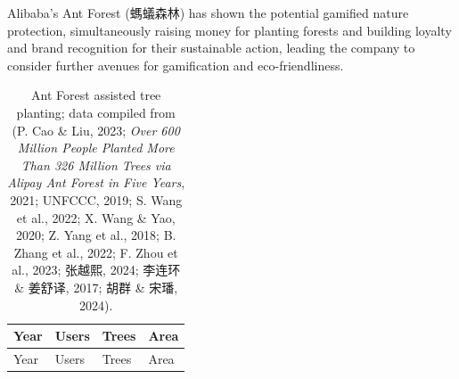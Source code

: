 \documentclass[
  12pt,
  letterpaper,
  DIV=11,
  numbers=noendperiod]{scrartcl}
\begin{document}
Alibaba's Ant Forest (螞蟻森林) has shown the potential gamified nature
protection, simultaneously raising money for planting forests and
building loyalty and brand recognition for their sustainable action,
leading the company to consider further avenues for gamification and
eco-friendliness.

\def\pandoctableshortcapt{Ant Forest Assisted Tree Planting - Growth
Story}

\begin{longtable}[]{@{}
  >{\raggedright\arraybackslash}p{}
  >{\raggedright\arraybackslash}p{}
  >{\raggedright\arraybackslash}p{}
  >{\raggedright\arraybackslash}p{}@{}}
\caption[Ant Forest Assisted Tree Planting - Growth Story]{Ant Forest
assisted tree planting; data compiled from (P. Cao \& Liu, 2023;
\emph{Over 600 {Million People Planted More Than} 326 {Million Trees}
via {Alipay Ant Forest} in {Five Years}}, 2021; UNFCCC, 2019; S. Wang et
al., 2022; X. Wang \& Yao, 2020; Z. Yang et al., 2018; B. Zhang et al.,
2022; F. Zhou et al., 2023; 张越熙, 2024; 李连环 \& 姜舒译, 2017; 胡群
\& 宋璠, 2024).}\tabularnewline
\toprule\noalign{}
\begin{minipage}[b]{\linewidth}\raggedright
Year
\end{minipage} & \begin{minipage}[b]{\linewidth}\raggedright
Users
\end{minipage} & \begin{minipage}[b]{\linewidth}\raggedright
Trees
\end{minipage} & \begin{minipage}[b]{\linewidth}\raggedright
Area
\end{minipage} \\
\midrule\noalign{}
\endfirsthead
\toprule\noalign{}
\begin{minipage}[b]{\linewidth}\raggedright
Year
\end{minipage} & \begin{minipage}[b]{\linewidth}\raggedright
Users
\end{minipage} & \begin{minipage}[b]{\linewidth}\raggedright
Trees
\end{minipage} & \begin{minipage}[b]{\linewidth}\raggedright
Area
\end{minipage} \\

\end{longtable}
\end{document}
